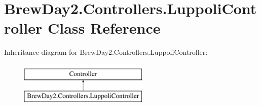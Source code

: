 \hypertarget{class_brew_day2_1_1_controllers_1_1_luppoli_controller}{}\section{Brew\+Day2.\+Controllers.\+Luppoli\+Controller Class Reference}
\label{class_brew_day2_1_1_controllers_1_1_luppoli_controller}
Inheritance diagram for Brew\+Day2.\+Controllers.\+Luppoli\+Controller\+:\begin{figure}[H]
\begin{center}
\leavevmode
\includegraphics[height=2.000000cm]{class_brew_day2_1_1_controllers_1_1_luppoli_controller}
\end{center}
\end{figure}
